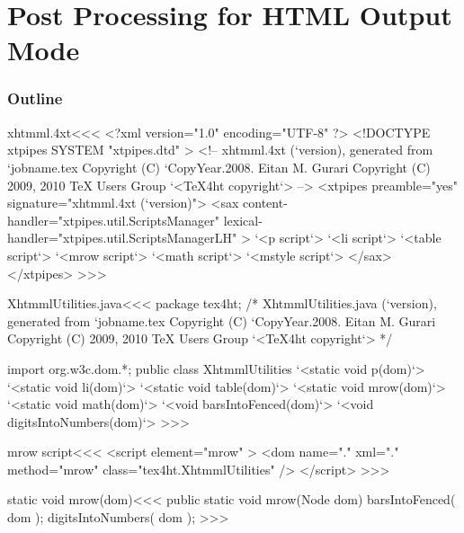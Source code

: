 \documentclass{article}
\begin{document}



\part{Post Processing for HTML Output Mode}


\section{Outline}



\<xhtmml.4xt\><<<
<?xml version="1.0" encoding="UTF-8" ?>
<!DOCTYPE xtpipes SYSTEM "xtpipes.dtd" >
<!-- xhtmml.4xt (`version), generated from `jobname.tex
     Copyright (C) `CopyYear.2008. Eitan M. Gurari
     Copyright (C) 2009, 2010 TeX Users Group
`<TeX4ht copyright`> -->
<xtpipes preamble="yes" signature="xhtmml.4xt (`version)">
   <sax content-handler="xtpipes.util.ScriptsManager" 
        lexical-handler="xtpipes.util.ScriptsManagerLH" >
     `<p script`>
     `<li script`>
     `<table script`>
     `<mrow script`>
     `<math script`>
     `<mstyle script`>
   </sax>
</xtpipes>
>>>


% 


\<XhtmmlUtilities.java\><<<
package tex4ht;
/* XhtmmlUtilities.java (`version), generated from `jobname.tex
   Copyright (C) `CopyYear.2008. Eitan M. Gurari
   Copyright (C) 2009, 2010 TeX Users Group
`<TeX4ht copyright`> */

import org.w3c.dom.*;
public class XhtmmlUtilities {
  `<static void p(dom)`>
  `<static void li(dom)`>
  `<static void table(dom)`>
  `<static void mrow(dom)`>
  `<static void math(dom)`>
  `<void barsIntoFenced(dom)`>
  `<void digitsIntoNumbers(dom)`>
}
>>>





\<mrow script\><<<
<script element="mrow" >
   <dom name="." xml="." method="mrow" class="tex4ht.XhtmmlUtilities" />
</script> 
>>>




\<static void mrow(dom)\><<<
public static void mrow(Node dom) {
   barsIntoFenced( dom );
   digitsIntoNumbers( dom );
}
>>>
\end{document}
